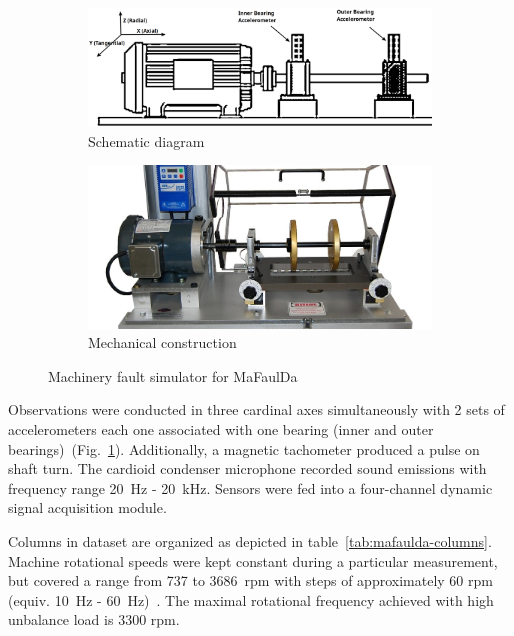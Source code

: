 \begin{figure}[h]
\centering
\begin{subfigure}[b]{0.48\textwidth}
	\includegraphics[width=\textwidth]{assets/mafaulda-simulator.png}
	\caption{Schematic diagram \cite{pestana-viana_influence_2016}}
\end{subfigure}
\hfill
\begin{subfigure}[b]{0.48\textwidth}
	\includegraphics[width=\textwidth]{assets/machinery-fault-simulator.jpg}
	\caption{Mechanical construction \cite{noauthor_spectraquest_nodate}}
\end{subfigure}
\caption{Machinery fault simulator for MaFaulDa}
\label{fig:mafaulda-simulator}
\end{figure}

Observations were conducted in three cardinal axes simultaneously with 2 sets of accelerometers each one associated with one bearing (inner and outer bearings)~(Fig.~\ref{fig:mafaulda-simulator}). Additionally, a magnetic tachometer produced a pulse on shaft turn. The cardioid condenser microphone recorded sound emissions with frequency range 20~Hz - 20~kHz. Sensors were fed into a four-channel dynamic signal acquisition module. 

Columns in dataset are organized as depicted in table~\ref{tab:mafaulda-columns}. Machine rotational speeds were kept constant during a particular measurement, but covered a range from 737 to 3686~rpm with steps of approximately 60 rpm (equiv. 10~Hz - 60~Hz)~\cite{pestana-viana_influence_2016}. The maximal rotational frequency achieved with high unbalance load is 3300 rpm.

